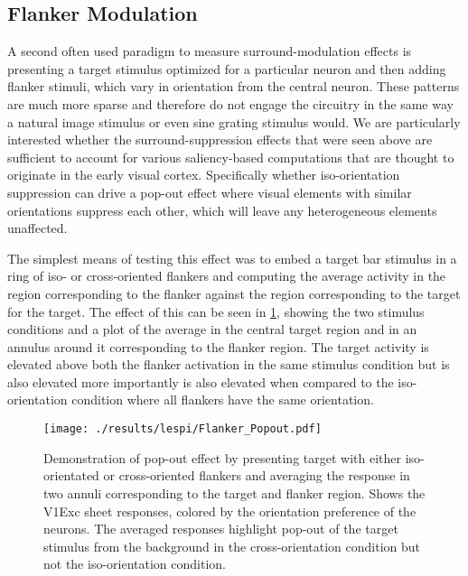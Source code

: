 \subsection{Flanker Modulation}

A second often used paradigm to measure surround-modulation effects is
presenting a target stimulus optimized for a particular neuron and
then adding flanker stimuli, which vary in orientation from the
central neuron. These patterns are much more sparse and therefore do
not engage the circuitry in the same way a natural image stimulus or
even sine grating stimulus would. We are particularly interested
whether the surround-suppression effects that were seen above are
sufficient to account for various saliency-based computations that are
thought to originate in the early visual cortex. Specifically whether
iso-orientation suppression can drive a pop-out effect where visual
elements with similar orientations suppress each other, which will
leave any heterogeneous elements unaffected.

The simplest means of testing this effect was to embed a target bar
stimulus in a ring of iso- or cross-oriented flankers and computing
the average activity in the region corresponding to the flanker
against the region corresponding to the target for the target. The
effect of this can be seen in \ref{Flanker_PopOut}, showing the two
stimulus conditions and a plot of the average in the central target
region and in an annulus around it corresponding to the flanker
region. The target activity is elevated above both the flanker
activation in the same stimulus condition but is also elevated more
importantly is also elevated when compared to the iso-orientation
condition where all flankers have the same orientation.

\begin{figure}
	\centering
        \texttt{[image: ./results/lespi/Flanker\_Popout.pdf]}
	\caption[Pop-out effect in simple flanker paradigm.]{Demonstration
      of pop-out effect by presenting target with either
      iso-orientated or cross-oriented flankers and averaging the
      response in two annuli corresponding to the target and flanker
      region. Shows the V1Exc sheet responses, colored by the
      orientation preference of the neurons. The averaged responses
      highlight pop-out of the target stimulus from the background in
      the cross-orientation condition but not the iso-orientation
      condition.}
	\label{Flanker_PopOut}
\end{figure}

